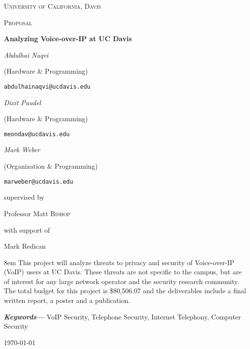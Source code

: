 
\providecommand{\keywords}[1]{\textbf{\textit{Keywords---}} #1} 

\begin{titlepage}
	
	\centering
	{\scshape\LARGE University of California, Davis \par}
	\vspace{1cm}
	{\scshape\Large Proposal\par}
	\vspace{1.5cm}
	{\huge\bfseries Analyzing Voice-over-IP at UC Davis\par}
	\vspace{1cm}
		{\Large\itshape Abdulhai Naqvi}\par
		(Hardware \& Programming)\par
	\texttt{abdulhainaqvi@ucdavis.edu}\par
	\vspace{1cm}
		{\Large\itshape Dixit Paudel}\par
		(Hardware \& Programming)\par
	\texttt{meondav@ucdavis.edu}\par
	\vspace{1cm}
		{\Large\itshape Mark Weber}\par
		(Organization \& Programming)\par
	\texttt{marweber@ucdavis.edu}\par
	\vspace{1.5cm}
	
	supervised by\par
  Professor Matt \textsc{Bishop}
	
	\vspace{1cm}
	
	with support of\par
	Mark Redican
	
	\vspace{1.5cm}

	\begingroup
	\leftskip8em
	\rightskip\leftskip
	This project will analyze threats to privacy and security of Voice-over-IP (VoIP) users at UC Davis. These threats are not specific to the campus, but are of interest for any large network operator and the security research community. The total budget for this project is \$80,506.07 and the deliverables include a final written report, a poster and a publication.
	\par
	\endgroup
	\vspace{1cm}

	
	\keywords{VoIP Security, Telephone Security, Internet Telephony, Computer Security}

	\vfill

	{\large \today\par}
\end{titlepage}

